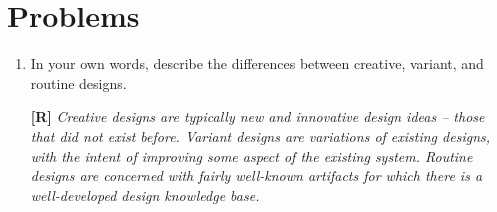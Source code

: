 \section{Problems}
\label{section:problems}

\begin{enumerate}
\def\labelenumi{\arabic{enumi}.}
\item
In your own words, describe the differences between creative, variant,
and routine designs.
 \begin{onlysolution}
 \textbf{[R]}
 \itshape
 Creative designs are typically new and innovative design ideas -- those
that did not exist before. Variant designs are variations of existing
designs, with the intent of improving some aspect of the existing
system. Routine designs are concerned with fairly well-known artifacts
for which there is a well-developed design knowledge base.
  \end{onlysolution}
  



\end{enumerate}
